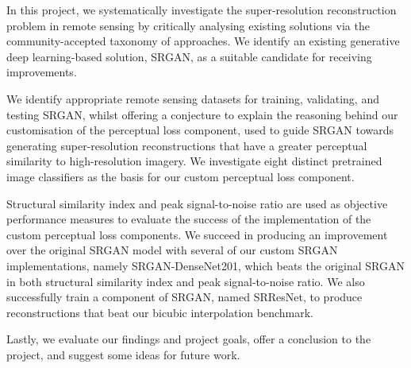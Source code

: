 In this project, we systematically investigate the super-resolution reconstruction problem in remote sensing by critically analysing existing solutions via the community-accepted taxonomy of approaches. We identify an existing generative deep learning-based solution, SRGAN, as a suitable candidate for receiving improvements.

We identify appropriate remote sensing datasets for training, validating, and testing SRGAN, whilst offering a conjecture to explain the reasoning behind our customisation of the perceptual loss component, used to guide SRGAN towards generating super-resolution reconstructions that have a greater perceptual similarity to high-resolution imagery. We investigate eight distinct pretrained image classifiers as the basis for our custom perceptual loss component.

Structural similarity index and peak signal-to-noise ratio are used as objective performance measures to evaluate the success of the implementation of the custom perceptual loss components. We succeed in producing an improvement over the original SRGAN model with several of our custom SRGAN implementations, namely SRGAN-DenseNet201, which beats the original SRGAN in both structural similarity index and peak signal-to-noise ratio. We also successfully train a component of SRGAN, named SRResNet, to produce reconstructions that beat our bicubic interpolation benchmark.

Lastly, we evaluate our findings and project goals, offer a conclusion to the project, and suggest some ideas for future work.
